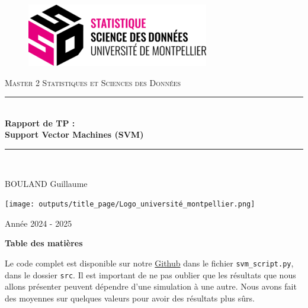 \documentclass{article}
\begin{document}
\begin{titlepage}

\newcommand{\HRule}{\rule{\linewidth}{0.5mm}}
\center 


\begin{figure}
    \centering
    \includegraphics[width=0.5\linewidth]{outputs/title_page/ssd_logo_couleur_noir-300x103.png}
\end{figure}



\textsc{\Large Master 2 Statistiques et Sciences des Données }\\[1cm] %
\HRule \\[0.4cm]
{ \huge \bfseries Rapport de TP :\\[0.6cm] Support Vector Machines (SVM) }\\[0.4cm]
\HRule \\[1.5cm]
\begin{center}
\begin{Large}
BOULAND Guillaume \\

\end{Large}
\end{center}
    
\vfill
\begin{center}
\texttt{[image: outputs/title\_page/Logo\_université\_montpellier.png]}\vspace{0.5cm}\\
\begin{Large} Année 2024 - 2025 \\
\end{Large}
\end{center}

\end{titlepage}
\newpage

\begin{center}
    {\LARGE\bfseries Table des matières}
\end{center}
\vspace{1cm}  %
\tableofcontents
\vspace{1cm} 
\newpage

Le code complet est disponible sur notre \href{https://github.com/guibouland/TP3_AP_SVM}{Github} dans le fichier \texttt{svm\_script.py}, dans le dossier \texttt{src}. Il est important de ne pas oublier que les résultats que nous allons présenter peuvent dépendre d'une simulation à une autre. Nous avons fait des moyennes sur quelques valeurs pour avoir des résultats plus sûrs.
\end{document}
